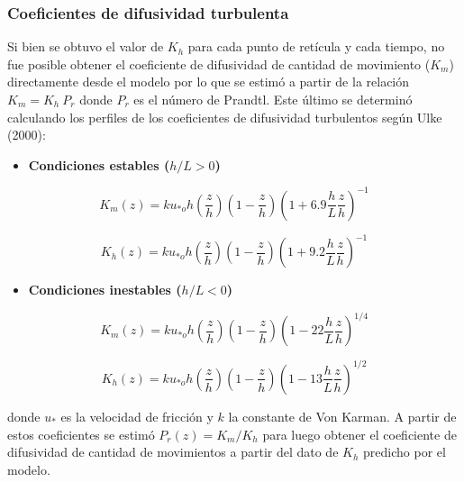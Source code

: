 \documentclass[12pt,spanish,oneside, a4paper]{book}
\providecommand{\tightlist}{%
  \setlength{\itemsep}{0pt}\setlength{\parskip}{0pt}}
\begin{document}
\subsubsection{Coeficientes de difusividad
turbulenta}\label{coeficientes-de-difusividad-turbulenta}

Si bien se obtuvo el valor de \(K_h\) para cada punto de retícula y cada
tiempo, no fue posible obtener el coeficiente de difusividad de cantidad
de movimiento (\(K_m\)) directamente desde el modelo por lo que se
estimó a partir de la relación \(K_m = K_h \: P_r\) donde \(P_r\) es el
número de Prandtl. Este último se determinó calculando los perfiles de
los coeficientes de difusividad turbulentos según Ulke (2000):

\begin{itemize}
\tightlist
\item
  \textbf{Condiciones estables (\(h/L > 0\))}
\end{itemize}

\begin{equation} \label{k-1}
K_m(z) =  ku_{*o}h\left (\frac{z}{h} \right )\left(1-\frac{z}{h} \right)\left (1 + 6.9\frac{h}{L}\frac{z}{h} \right)^{-1}
\end{equation}

\begin{equation} \label{k-2}
K_h(z) =  ku_{*o}h\left (\frac{z}{h} \right )\left(1-\frac{z}{h} \right)\left (1 + 9.2\frac{h}{L}\frac{z}{h} \right)^{-1}
\end{equation}

\begin{itemize}
\tightlist
\item
  \textbf{Condiciones inestables (\(h/L < 0\))}
\end{itemize}

\begin{equation} \label{k-3}
K_m(z) =  ku_{*o}h\left (\frac{z}{h} \right )\left(1-\frac{z}{h} \right)\left (1 - 22\frac{h}{L}\frac{z}{h} \right)^{1/4}
\end{equation}

\begin{equation} \label{k-4}
K_h(z) =  ku_{*o}h\left (\frac{z}{h} \right )\left(1-\frac{z}{h} \right)\left (1 - 13\frac{h}{L}\frac{z}{h} \right)^{1/2}
\end{equation}

donde \(u_*\) es la velocidad de fricción y \(k\) la constante de Von
Karman. A partir de estos coeficientes se estimó \(P_r(z) = K_m/K_h\)
para luego obtener el coeficiente de difusividad de cantidad de
movimientos a partir del dato de \(K_h\) predicho por el modelo.
\end{document}
